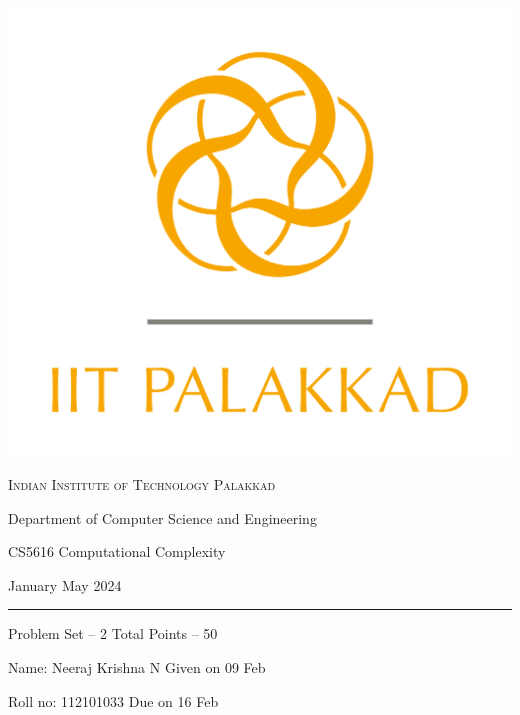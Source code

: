 \documentclass[11pt, a4paper,answers]{exam}
\begin{document}
	\noindent
	\begin{minipage}[l]{0.1\textwidth}
		\noindent
		\includegraphics[width=2.4\textwidth]{iitpkd}
	\end{minipage}
	\hfill
	\begin{minipage}[c]{0.8\textwidth}
		\begin{center}
			{\large \textsc{\textcolor{iitpkdcolor}{Indian Institute of Technology Palakkad}} \par
				\small	Department of Computer Science and Engineering	\par
				\large	CS5616 Computational Complexity \par 
				\small January May 2024}
		\end{center}
	\end{minipage}
	\par
	\vspace{2mm}
	\hrule
	\vspace{2mm}
	\begin{minipage}{0.9\textwidth} 
		\textsf{Problem Set} -- 2  \hfill  \textsf{Total Points} -- 50
		
		{\small \textsf{Name}: Neeraj Krishna N \hfill \small \textsf{Given on} 09 Feb}
		
		{\small \textsf{Roll no}: 112101033 \hfill \small \textsf{Due on} 16 Feb}
	\end{minipage}
	\vspace{0.2in}
	\noindent
	
\end{document}

